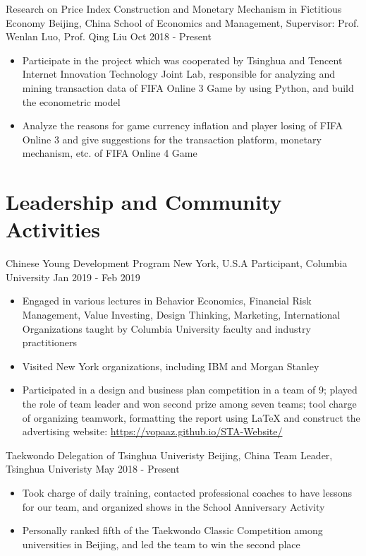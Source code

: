 \documentclass{resumeEN}
\begin{document}
    \Experience
    {Research on Price Index Construction and Monetary Mechanism in Fictitious Economy}
    {Beijing, China}
    {School of Economics and Management, Supervisor: Prof. Wenlan Luo, Prof. Qing Liu}
    {Oct 2018 - Present}

    \begin{itemize}
        \item Participate in the project which was cooperated by Tsinghua and Tencent Internet Innovation Technology Joint Lab, responsible for analyzing and mining transaction data of FIFA Online 3 Game by using Python, and build the econometric model
        \item Analyze the reasons for game currency inflation and player losing of FIFA Online 3 and give suggestions for the transaction platform, monetary mechanism, etc. of FIFA Online 4 Game
    \end{itemize}


    \section{Leadership and Community Activities}

    \Experience
    {Chinese Young Development Program}
    {New York, U.S.A}
    {Participant, Columbia University}
    {Jan 2019 - Feb 2019}

    \begin{itemize}
        \item Engaged in various lectures in Behavior Economics, Financial Risk Management, Value Investing, Design Thinking, Marketing, International Organizations taught by Columbia University faculty and industry practitioners
        \item Visited New York organizations, including IBM and Morgan Stanley
        \item Participated in a design and business plan competition in a team of 9; played the role of team leader and won second prize among seven teams; tool charge of organizing teamwork, formatting the report using {\LaTeX} and construct the advertising website: \href{https://vopaaz.github.io/STA-Website/}{https://vopaaz.github.io/STA-Website/}
    \end{itemize}

    \Experience
    {Taekwondo Delegation of Tsinghua Univeristy}
    {Beijing, China}
    {Team Leader, Tsinghua Univeristy}
    {May 2018 - Present}

    \begin{itemize}
        \item Took charge of daily training, contacted professional coaches to have lessons for our team, and organized shows in the School Anniversary Activity
        \item Personally ranked fifth of the Taekwondo Classic Competition among universities in Beijing, and led the team to win the second place
    \end{itemize}
\end{document}
